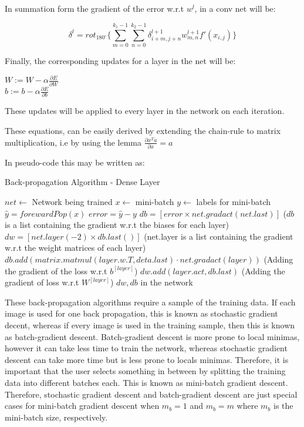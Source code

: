 In summation form the gradient of the error w.r.t $w^{l}$, in a conv net will be:

\begin{equation*}
    \delta^{l} = rot_{180^\circ} \{\sum_{m=0}^{k_{1} -1} \sum_{n=0}^{k_{2}-1} \delta_{i+m,j+n}^{l+1} w_{m,n}^{l+1}f'(x_{i,j}) \}
\end{equation*}

Finally, the corresponding updates for a layer in the net will be:

\begin{center}
    $W := W - \alpha \frac{\partial E}{\partial W}$ \\
    $b := b - \alpha \frac{\partial E}{\partial b}$
\end{center}
These updates will be applied to every layer in the network on each iteration.

These equations, can be easily derived by extending the chain-rule to matrix multiplication, i.e by using the lemma $\frac{\partial x^Ta}{\partial x} = a$

In pseudo-code this may be written as:
\begin{algorithm}[H]
\caption{Back-propagation Algorithm - Dense Layer}\label{StandardBackpropagation}
\begin{algorithmic}[1]
\State $net \gets$ Network being trained
\State $x \gets$ mini-batch
\State $y \gets$ labels for mini-batch
\\
\State $\hat{y} = forewardPop(x)$
\State $error = \hat{y} - y$
\State $db = [error \times net.gradact(net.last)]$ ($db$ is a list containing the gradient w.r.t the biases for each layer)
\State $dw = [net.layer(-2) \times db.last()]$ (net.layer is a list containing the gradient w.r.t the weight matrices of each layer)
\\
\State $db.add(matrix.matmul(layer.w.T, deta.last) \cdot net.gradact(layer))$ (Adding the gradient of the loss w.r.t $b^{[layer]}$)
\State $dw.add(layer.act, db.last)$ (Adding the gradient of loss w.r.t  $W^{[layer]}$)
\EndFor
\Return $dw, db$  in the network
\end{algorithmic}
\end{algorithm}

These back-propagation algorithms require a sample of the training data. If each image is used for one back propagation, this is known as stochastic gradient decent, whereas if every image is used in the training sample, then this is known as batch-gradient descent. Batch-gradient descent is more prone to local minimas, however it can take less time to train the network, whereas stochastic gradient descent can take more time but is less prone to locals minimas. Therefore, it is important that the user selects something in between by splitting the training data into different batches each. This is known as mini-batch gradient descent. Therefore, stochastic gradient descent and batch-gradient descent are just special cases for mini-batch gradient descent when $m_b = 1$ and $m_b = m$ where $m_b$ is the mini-batch size, respectively.